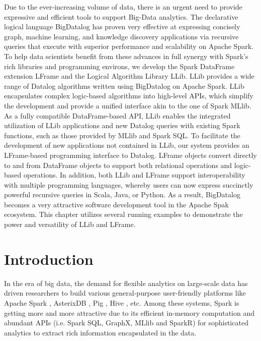 
Due to the ever-increasing volume of data, there is an urgent need to provide expressive and efficient %
tools to support Big-Data analytics.
The declarative logical  language BigDatalog %
has proven very effective at expressing concisely graph, machine learning, and knowledge discovery applications via recursive queries that execute with superior 
performance and scalability  on  Apache Spark. 
To help data scientists benefit from these advances in full synergy with  Spark's rich libraries and programming environs, we develop the  Spark DataFrame extension LFrame and the Logical Algorithm Library  LLib.
LLib provides a wide range of Datalog algorithms written using BigDatalog  on Apache Spark. LLib encapsulates complex logic-based algorithms into 
high-level APIs, which simplify the development and   provide a unified interface akin to the one of Spark MLlib.   As a fully compatible
DataFrame-based API, LLib enables the integrated utilization of LLib 
applications and new Datalog queries with existing Spark functions, such 
as those provided by MLlib and Spark SQL. 
To facilitate the development 
of new applications not contained in LLib, our system provides an 
LFrame-based  programming interface to Datalog.
LFrame objects convert directly to and from DataFrame objects to support both relational operations and  logic-based operations. 
In addition, both LLib and LFrame support interoperability with multiple programming languages, whereby users can now  express  succinctly powerful recursive queries in 
Scala, Java, or Python. 
As a result, BigDatalog becomes a very attractive software development tool in the Apache Spak ecosystem. 
This chapter utilizes several running examples to demonstrate the  power and versatility of LLib and LFrame.

\section{Introduction}
In the era of big data, the demand for flexible analytics on large-scale data has driven researchers to build various general-purpose user-friendly platforms like Apache Spark   \citep{zaharia2012resilient}, AsterixDB \citep{alsubaiee2014asterixdb}, Pig \citep{olston2008pig}, Hive \citep{thusoo2009hive}, etc.  Among these systems, Spark is getting more and more attractive due to its efficient in-memory computation and abundant APIs (i.e. Spark SQL, GraphX, MLlib and SparkR) for sophisticated analytics  to extract rich information encapsulated in the data.

